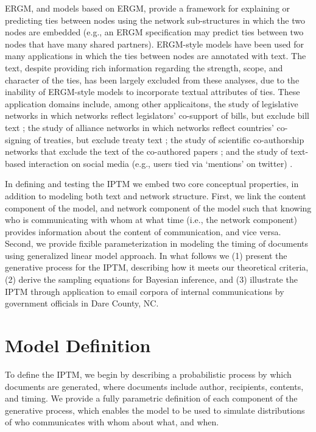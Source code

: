 \documentclass{article}
\begin{document}
ERGM, and models based on ERGM, provide a framework for explaining or predicting ties between nodes using the network sub-structures in which the two nodes are embedded (e.g., an ERGM specification may predict ties between two nodes that have many shared partners). ERGM-style models have been used for many applications in which the ties between nodes are annotated with text. The text, despite providing rich information regarding the strength, scope, and character of the ties, has been largely excluded from these analyses, due to the inability of ERGM-style models to incorporate textual attributes of ties. These application domains include, among other applicaitons, the study of legislative networks in which networks reflect legislators' co-support of bills, but exclude bill text \cite{bratton2011networks,aleman2013explaining}; the study of alliance networks in which networks reflect countries' co-signing of treaties, but exclude treaty text \cite{camber2010geometry,cranmer2012complex,cranmer2012toward,kinne2016agreeing}; the study of scientific co-authorship networks that exclude the text of the co-authored papers \cite{kronegger2011collaboration,liang2015changing,fahmy2016gender}; and the study of text-based interaction on social media (e.g., users tied via `mentions' on twitter) \cite{yoon2014strategies,peng2016follower,lai2017connecting}.

In defining and testing the IPTM we embed two core conceptual properties, in addition to modeling both text and network structure. First, we link the content component of the model, and network component of the model such that knowing who is communicating with whom at what time (i.e., the network component) provides information about the content of communication, and vice versa. Second, we provide fixible parameterization in modeling the timing of documents using generalized linear model approach. In what follows we (1) present the generative process for the IPTM, describing how it meets our theoretical criteria, (2) derive the sampling equations for Bayesian inference, and (3) illustrate the IPTM through application to email corpora of internal communications by government officials in Dare County, NC. 

\section{Model Definition}\label{model definition}

To define the IPTM, we begin by describing a probabilistic process by which documents are generated, where documents include author, recipients, contents, and timing. We provide a fully parametric definition of each component of the generative process, which enables the model to be used to simulate distributions of who communicates with whom about what, and when.
\end{document}
